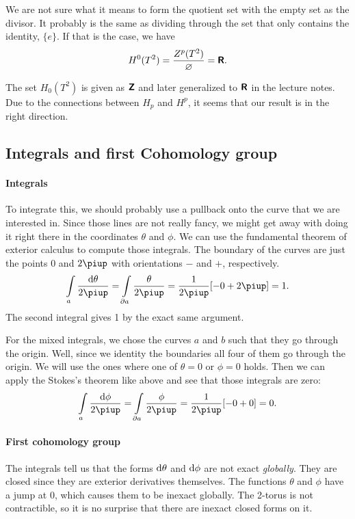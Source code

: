 \documentclass[11pt, english, fleqn, DIV=15, headinclude, BCOR=1cm]{scrartcl}
\begin{document}
We are not sure what it means to form the quotient set with the empty set as
the divisor. It probably is the same as dividing through the set that only
contains the identity, $\{ e \}$. If that is the case, we have
\[
    H^0(T^2) = \frac{Z^p(T^2)}{\varnothing} = \text{\bfseries\sffamily R}.
\]

The set $H_0(T^2)$ is given as $\text{\bfseries\sffamily Z}$ and later generalized to $\text{\bfseries\sffamily R}$ in the
lecture notes. Due to the connections between $H_p$ and $H^p$, it seems that
our result is in the right direction.

\subsection{Integrals and first Cohomology group}

\paragraph{Integrals}

To integrate this, we should probably use a pullback onto the curve that we are
interested in. Since those lines are not really fancy, we might get away with
doing it right there in the coordinates $\theta$ and $\phi$. We can use the
fundamental theorem of exterior calculus to compute those integrals. The
boundary of the curves are just the points 0 and $2\piup$ with orientations
$-$ and $+$, respectively.
\[
    \intop_a \frac{\dif \theta}{2\piup}
    = \intop_{\partial a} \frac{\theta}{2\piup}
    = \frac{1}{2\piup} [-0 + 2\piup] = 1.
\]
The second integral gives 1 by the exact same argument.

For the mixed integrals, we chose the curves $a$ and $b$ such that they go
through the origin. Well, since we identity the boundaries all four of them go
through the origin. We will use the ones where one of $\theta = 0$ or $\phi =
0$ holds. Then we can apply the Stokes's theorem like above and see that those
integrals are zero:
\[
    \intop_a \frac{\dif \phi}{2\piup}
    = \intop_{\partial a} \frac{\phi}{2\piup}
    = \frac{1}{2\piup} [-0 + 0] = 0.
\]

\paragraph{First cohomology group}

The integrals tell us that the forms $\mathop{}\!\mathrm d \theta$ and $\mathop{}\!\mathrm d \phi$ are not
exact \emph{globally}. They are closed since they are exterior derivatives
themselves. The functions $\theta$ and $\phi$ have a jump at 0, which causes
them to be inexact globally. The 2-torus is not contractible, so it is no
surprise that there are inexact closed forms on it.
\end{document}
